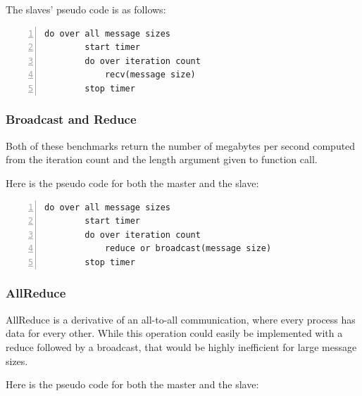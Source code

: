 The slaves' pseudo code is as follows:

\begin{minipage}{\textwidth}
\end{minipage}

\begin{minipage}{\textwidth}
\begin{lstlisting}[frame=single,numbers=left]
   do over all message sizes 
        start timer
        do over iteration count 
            recv(message size) 
        stop timer
\end{lstlisting}
\end{minipage}

\subsubsection{Broadcast and Reduce}

Both of these benchmarks return the number of megabytes per second computed
from the iteration count and the length argument given to function call.

Here is the pseudo code for both the master and the slave:

\begin{minipage}{\textwidth}
\end{minipage}

\begin{minipage}{\textwidth}
\begin{lstlisting}[frame=single,numbers=left]
   do over all message sizes 
        start timer
        do over iteration count
            reduce or broadcast(message size)
        stop timer
\end{lstlisting}
\end{minipage}

\subsubsection{AllReduce}

AllReduce is a derivative of an all-to-all communication, where every
process has data for every other. While this operation could easily be
implemented with a reduce followed by a broadcast, that would be highly
inefficient for large message sizes. 

Here is the pseudo code for both the master and the slave:

\begin{minipage}{\textwidth}
\end{minipage}

